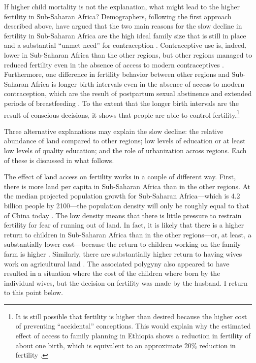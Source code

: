 \documentclass[]{article}
\begin{document}
If higher child mortality is not the explanation, what might lead to the higher fertility in Sub-Saharan Africa? Demographers, following the first approach described above, have argued that the two main reasons for the slow decline in fertility in Sub-Saharan Africa are the high ideal family size that is still in place and a substantial ``unmet need'' for contraception \citep{Bongaarts2013a,Singh2017}. Contraceptive use is, indeed, lower in Sub-Saharan Africa than the other regions, but other regions managed to reduced fertility even in the absence of access to modern contraceptives \citet{Schultz1985,Galloway1987,Bailey1998,bengtsson06}. Furthermore, one difference in fertility behavior between other regions and Sub-Saharan Africa is longer birth intervals even in the absence of access to modern contraception, which are the result of postpartum sexual abstinence and extended periods of breastfeeding \citep{Caldwell1992}. To the extent that the longer birth intervals are the result of conscious decisions, it shows that people are able to control fertility.\footnote{It is still possible that fertility is higher than desired because the higher cost of preventing ``accidental'' conceptions. This would explain why the estimated effect of access to family planning in Ethiopia shows a reduction in fertility of about one birth, which is equivalent to an approximate 20\% reduction in fertility \citet{Portner2014a}.}

Three alternative explanations may explain the slow decline: the relative abundance of land compared to other regions; low levels of education or at least low levels of quality education; and the role of urbanization across regions. Each of these is discussed in what follows.

The effect of land access on fertility works in a couple of different way. First, there is more land per capita in Sub-Saharan Africa than in the other regions. At the median projected population growth for Sub-Saharan Africa---which is 4.2 billion people by 2100---the population density will only be roughly equal to that of China today \citep[p 235]{Gerland2014}. The low density means that there is little pressure to restrain fertility for fear of running out of land. In fact, it is likely that there is a higher return to children in Sub-Saharan Africa than in the other regions---or, at least, a substantially lower cost---because the return to children working on the family farm is higher \citep{Caldwell1992}. Similarly, there are substantially higher return to having wives work on agricultural land \citep{jacoby95}. The associated polygyny also appeared to have resulted in a situation where the cost of the children where born by the individual wives, but the decision on fertility was made by the husband. I return to this point below.
\end{document}
